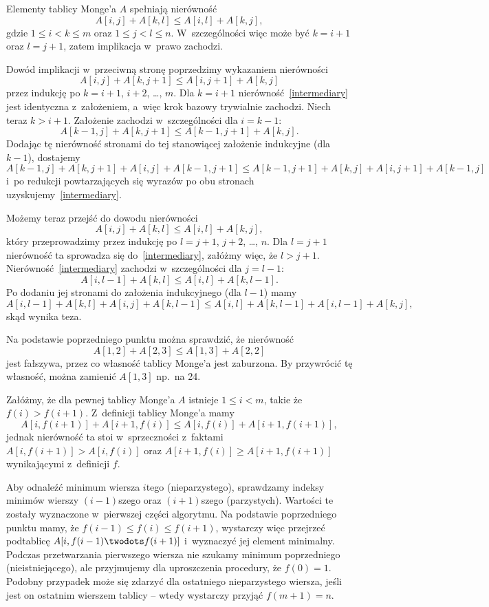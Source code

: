 
\subproblem %
Elementy tablicy Monge'a $A$ spełniają nierówność
\[
	A[i,j]+A[k,l] \le A[i,l]+A[k,j],
\]
gdzie $1\le i<k\le m$ oraz $1\le j<l\le n$.
W~szczególności więc może być $k=i+1$ oraz $l=j+1$, zatem implikacja w~prawo zachodzi.

Dowód implikacji w~przeciwną stronę poprzedzimy wykazaniem nierówności
\[
	A[i,j]+A[k,j+1] \le A[i,j+1]+A[k,j] \tag{$*$}\label{intermediary}
\]
przez indukcję po $k=i+1$, $i+2$, \dots, $m$.
Dla $k=i+1$ nierówność~\eqref{intermediary} jest identyczna z~założeniem, a~więc krok bazowy trywialnie zachodzi.
Niech teraz $k>i+1$.
Założenie zachodzi w~szczególności dla $i=k-1$:
\[
	A[k-1,j]+A[k,j+1] \le A[k-1,j+1]+A[k,j].
\]
Dodając tę nierówność stronami do tej stanowiącej założenie indukcyjne (dla $k-1$), dostajemy
\[
	A[k-1,j]+A[k,j+1]+A[i,j]+A[k-1,j+1] \le A[k-1,j+1]+A[k,j]+A[i,j+1]+A[k-1,j]
\]
i~po redukcji powtarzających się wyrazów po obu stronach uzyskujemy~\eqref{intermediary}.

Możemy teraz przejść do dowodu nierówności
\[
	A[i,j]+A[k,l] \le A[i,l]+A[k,j],
\]
który przeprowadzimy przez indukcję po $l=j+1$, $j+2$, \dots, $n$.
Dla $l=j+1$ nierówność ta sprowadza się do~\eqref{intermediary}, załóżmy więc, że $l>j+1$.
Nierówność~\eqref{intermediary} zachodzi w~szczególności dla $j=l-1$:
\[
	A[i,l-1]+A[k,l] \le A[i,l]+A[k,l-1].
\]
Po dodaniu jej stronami do założenia indukcyjnego (dla $l-1$) mamy
\[
	A[i,l-1]+A[k,l]+A[i,j]+A[k,l-1] \le A[i,l]+A[k,l-1]+A[i,l-1]+A[k,j],
\]
skąd wynika teza.

\subproblem %
Na podstawie poprzedniego punktu można sprawdzić, że nierówność
\[
	A[1,2]+A[2,3] \le A[1,3]+A[2,2]
\]
jest fałszywa, przez co własność tablicy Monge'a jest zaburzona.
By przywrócić tę własność, można zamienić $A[1,3]$ np.\ na 24.

\subproblem %
Załóżmy, że dla pewnej tablicy Monge'a $A$ istnieje $1\le i<m$, takie że $f(i)>f(i+1)$.
Z~definicji tablicy Monge'a mamy
\[
	A[i,f(i+1)]+A[i+1,f(i)] \le A[i,f(i)]+A[i+1,f(i+1)],
\]
jednak nierówność ta stoi w~sprzeczności z~faktami $A[i,f(i+1)]>A[i,f(i)]$ oraz $A[i+1,f(i)]\ge A[i+1,f(i+1)]$ wynikającymi z~definicji $f$.

\subproblem %
Aby odnaleźć minimum wiersza $i$\nbhyphen tego (nieparzystego), sprawdzamy indeksy minimów wierszy $(i-1)$\nbhyphen szego oraz $(i+1)$\nbhyphen szego (parzystych).
Wartości te zostały wyznaczone w~pierwszej części algorytmu.
Na podstawie poprzedniego punktu mamy, że $f(i-1)\le f(i)\le f(i+1)$, wystarczy więc przejrzeć podtablicę $A[i,f(i-1)\twodots f(i+1)]$ i~wyznaczyć jej element minimalny.
Podczas przetwarzania pierwszego wiersza nie szukamy minimum poprzedniego (nieistniejącego), ale przyjmujemy dla uproszczenia procedury, że $f(0)=1$.
Podobny przypadek może się zdarzyć dla ostatniego nieparzystego wiersza, jeśli jest on ostatnim wierszem tablicy -- wtedy wystarczy przyjąć $f(m+1)=n$.


